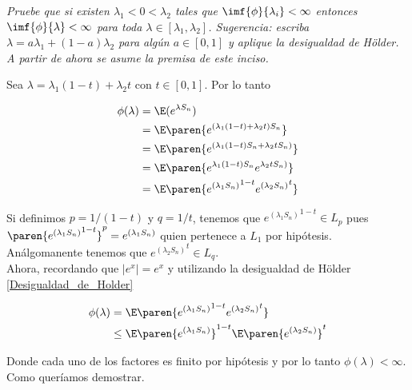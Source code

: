 \emph{
	Pruebe que si existen $\lambda_1<0<\lambda_2$ tales que $\imf{\phi}{\lambda_i}<\infty$ entonces $\imf{\phi}{\lambda}<\infty$ 
	para toda $\lambda\in [\lambda_1,\lambda_2]$. Sugerencia: escriba $\lambda=a\lambda_1+(1-a)\lambda_2$ para alg\'un $a\in [0,1]$ 
	y aplique la desigualdad de H\"older. A partir de ahora se asume la premisa de este inciso.
}

\afterstatement\par\null

Sea $\lambda = \lambda_1 (1-t) + \lambda_2 t$ con $t \in [0, 1]$. Por lo tanto 

\begin{align}
    \phi(\lambda)   &= \E(e^{\lambda S_n})                                              \\
                    &= \E\paren{e^{(\lambda_1 (1-t) + \lambda_2 t) S_n}}                \\
                    &= \E\paren{e^{(\lambda_1 (1-t) S_n + \lambda_2 tS_n) }}            \\  
                    &= \E\paren{e^{\lambda_1 (1-t) S_n} e^{\lambda_2 tS_n) }}           \\  
                    &= \E\paren{{e^{(\lambda_1 S_n)}}^{1-t} {e^{(\lambda_2 S_n)}}^t}      
\end{align}

Si definimos $p = 1/(1-t)$ y $q = 1/t$, tenemos que
${e^{(\lambda_1 S_n)}}^{1-t} \in L_p$ pues $\paren{{e^{(\lambda_1 S_n)}}^{1-t}}^p = e^{(\lambda_1 S_n)}$ quien 
pertenece a $L_1$ por hipótesis. Análgomanente tenemos que  ${e^{(\lambda_2 S_n)}}^t \in L_q$.\\

Ahora, recordando que $|e^x| = e^x$ y utilizando la desigualdad de Hölder \eqref{Desigualdad_de_Holder}

\begin{align}
    \phi(\lambda)   &=      \E\paren{{e^{(\lambda_1 S_n)}}^{1-t} {e^{(\lambda_2 S_n)}}^t}           \\      
                    &\leq   \E\paren{e^{(\lambda_1 S_n)}}^{1-t} \E\paren{e^{(\lambda_2 S_n)}}^t     
\end{align}

Donde cada uno de los factores es finito por hipótesis y por lo tanto $\phi(\lambda) < \infty$. Como queríamos demostrar.